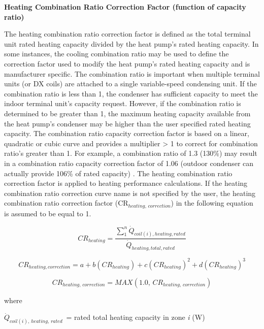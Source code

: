 \textbf{Heating Combination Ratio Correction Factor (function of capacity ratio)}

The heating combination ratio correction factor is defined as the total terminal unit rated heating capacity divided by the heat pump's rated heating capacity. In some instances, the cooling combination ratio may be used to define the correction factor used to modify the heat pump's rated heating capacity and is manufacturer specific. The combination ratio is important when multiple terminal units (or DX coils) are attached to a single variable-speed condensing unit. If the combination ratio is less than 1, the condenser has sufficient capacity to meet the indoor terminal unit's capacity request. However, if the combination ratio is determined to be greater than 1, the maximum heating capacity available from the heat pump's condenser may be higher than the user specified rated heating capacity. The combination ratio capacity correction factor is based on a linear, quadratic or cubic curve and provides a multiplier > 1 to correct for combination ratio's greater than 1. For example, a combination ratio of 1.3 (130\%) may result in a combination ratio capacity correction factor of 1.06 (outdoor condenser can actually provide 106\% of rated capacity) . The heating combination ratio correction factor is applied to heating performance calculations. If the heating combination ratio correction curve name is not specified by the user, the heating combination ratio correction factor (CR\(_{heating,\, correction}\)) in the following equation is assumed to be equal to 1.

\begin{equation}
  CR_{heating} = \frac{\sum\limits_1^n \dot{Q}_{coil(i),heating,rated}}{\dot{Q}_{heating,total,rated}}
\end{equation}

\begin{equation}
  CR_{heating,correction} = a + b \left( CR_{heating} \right) + c \left( CR_{heating} \right)^2 + d \left( CR_{heating} \right)^3
\end{equation}

\begin{equation}
  CR_{heating,\,correction} = MAX \left( 1.0,\,CR_{heating,\,correction} \right)
\end{equation}

where

\(\dot{Q}_{coil(i),\,heating,\,rated}\) = rated total heating capacity in zone \emph{i} (W)

